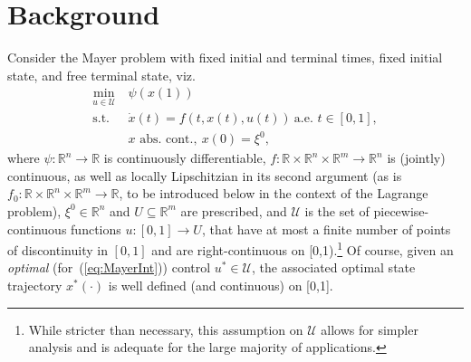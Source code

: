 \documentclass[letterpaper,10pt,conference]{ieeeconf}
\def\R{{\mathbb{R}}}
\def\tf{{t_{\rm f}}}
\begin{document}
\section{Background}
\label{sec:background}

Consider the Mayer problem with fixed initial and terminal times,
fixed initial state, and free terminal state, viz.
\begin{equation}
\label{eq:MayerInt}
\begin{aligned}
\min_{u\in\mathcal U}&\ \psi(x(1))\\
\text{s.t.~}&\ \dot x(t)=f(t,x(t),u(t))~\text{a.e.~}t\in[0,1],\\
&\ x\text{~abs.~cont.},~x(0)=\xi^0,
\end{aligned}
\end{equation}
where $\psi:\R^n\to\R$ is continuously differentiable, 
$f:\R\times\R^n\times\R^m\to\R^n$ is (jointly) continuous,
as well as locally Lipschitzian in its second argument (as is
$f_0:\R\times\R^n\times\R^m\to\R$, to be introduced below in the context
of the Lagrange problem),
$\xi^0\in\R^n$ and $U\subseteq\R^m$ are prescribed,
and $\mathcal U$ is the set of piecewise-continuous functions
$u:[0,1]\to U$, %
that have at most a finite number of points
of discontinuity in $[0,1]$ and are right-continuous 
on [0,1).\footnote{%
While stricter than necessary, this 
assumption on $\mathcal U$ allows for simpler analysis and is adequate 
for the large majority of applications.}
Of course, given an {\em optimal} (for~(\ref{eq:MayerInt})) control 
$u^*\in\mathcal U$,
the associated optimal state trajectory $x^*(\cdot)$ is 
well defined (and continuous) on [0,1].
\end{document}
